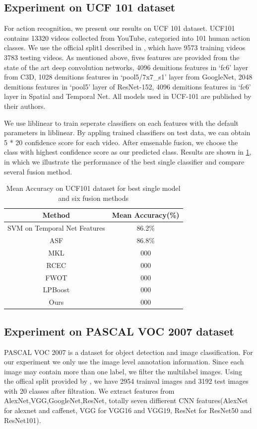 \documentclass[letterpaper]{article}
\begin{document}
\subsection{Experiment on UCF 101 dataset}
For action recognition, we present our results on UCF 101 dataset\cite{soomro2012ucf101}. UCF101 contains 13320 videos collected from YouTube, categoried into 101 human action classes. We use the official split1 described in \cite{soomro2012ucf101}, which have 9573 training videos 3783 testing videos. As mentioned above, fives features are provided from the state of the art deep convolution networks, 4096 demitions features in `fc6' layer from C3D, 1028 demitions features in `pool5/7x7\_s1' layer from  GoogleNet, 2048 demitions features in `pool5' layer of ResNet-152, 4096 demitions features in `fc6' layer in Spatial and Temporal Net. All models used in UCF-101 are published by their authors.

We use liblinear to train seperate classifiers on each features with the default parameters in liblinear. By appling trained classifiers on test data, we can obtain 5 * 20 confidence score for each video. After emsenable fusion, we choose the class with highest confidence score as our predicted class. Results are shown in \ref{table:ucf101}, in which we illustrate the performance of the best single classifier and compare several fusion method.

\begin{table}[h]\small
\centering
\label{table:ucf101}
\begin{tabular}{c|c}
\hline
Method & Mean Accuracy(\%) \\\hline
SVM on Temporal Net Features & 86.2\% \\\hline
ASF &  86.8\% \\
MKL &  000 \\
RCEC &  000 \\
FWOT &  000 \\
LPBoost &  000 \\\hline
Ours &  000 \\
\hline
\end{tabular}
\caption{Mean Accuracy on UCF101 dataset for best single model and six fusion methods}
\end{table}




\subsection{Experiment on PASCAL VOC 2007 dataset}
PASCAL VOC 2007 is a dataset for object detection and image classification. For our experiment we only use the image level annotation information. Since each image may contain more than one label, we filter the multilabel images. Using the offical split provided by \cite{pascal-voc-2007}, we have 2954 trainval images and 3192 test images with 20 classes after filtration. We extract features from AlexNet,VGG,GoogleNet,ResNet, totally seven diffierent CNN features(AlexNet for alexnet and caffenet, VGG for VGG16 and VGG19, ResNet for ResNet50 and ResNet101).
\end{document}
